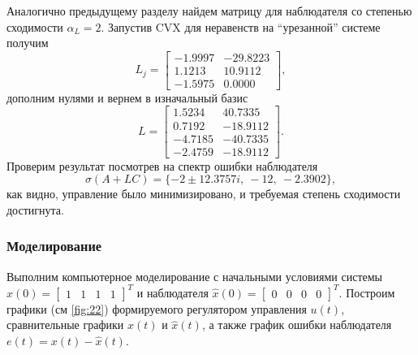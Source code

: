 Аналогично предыдущему разделу найдем матрицу для наблюдателя 
со степенью сходимости $\alpha_L=2$. 
Запустив CVX для неравенств на ``урезанной'' системе получим
\begin{equation*}
    L_j=\begin{bmatrix}
        -1.9997&	-29.8223\\
        1.1213&	10.9112\\
        -1.5975&	0.0000
    \end{bmatrix},
\end{equation*}
дополним нулями и вернем в изначальный базис
\begin{equation*}
    L=\begin{bmatrix}
        1.5234&	40.7335\\
        0.7192&	-18.9112\\
        -4.7185&	-40.7335\\
        -2.4759&	-18.9112
    \end{bmatrix}.
\end{equation*}
Проверим результат посмотрев на спектр ошибки наблюдателя
\begin{equation*}
    \sigma(A+LC)=\{-2 \pm12.3757i,\ -12,\ -2.3902 \},
\end{equation*}
как видно, управление было минимизировано, и требуемая степень сходимости достигнута.

\subsubsection{Моделирование}

Выполним компьютерное моделирование с начальными условиями системы
$x(0)=\begin{bmatrix}
    1&1&1&1
\end{bmatrix}^T$ и наблюдателя $\hat x(0)=\begin{bmatrix}
    0&0&0&0
\end{bmatrix}^T.$ Построим графики (см \autoref{fig:22})
формируемого регулятором управления $u(t)$, сравнительные графики $x(t)$ и
$\hat x(t)$, а также график ошибки наблюдателя $e(t) = x(t) -\hat x(t).$

